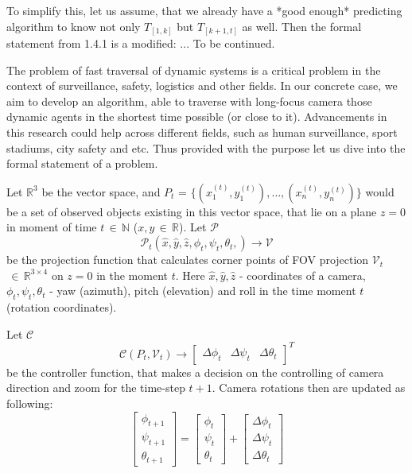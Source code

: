 To simplify this, let us assume, that we already have a *good enough* predicting algorithm to know not only $T_{[1,k]}$ but $T_{[k+1, t]}$ as well. Then the formal statement from 1.4.1 is a modified:
... To be continued.

\fi %

The problem of fast traversal of dynamic systems is a critical problem in the context of surveillance, safety, logistics and other fields. In our concrete case, we aim to develop an algorithm, able to traverse with long-focus camera those dynamic agents in the shortest time possible (or close to it). Advancements in this research could help across different fields, such as human surveillance, sport stadiums, city safety and etc. Thus provided with the purpose let us dive into the formal statement of a problem. 

Let $\mathbb{R}^{3}$ be the vector space, and $P_{t}$ = $\{ (x_{1}^{(t)},y_{1}^{(t)}), \dots, (x_{n}^{(t)},y_{n}^{(t)}) \}$ would be a set of observed objects existing in this vector space, that lie on a plane $z=0$ in moment of time $t \, \in \, \mathbb{N}$ ($x,y \, \in \, \mathbb{R}$). Let $\mathcal{P}$
$$\mathcal{P}_{t}(\hat{x}, \hat{y}, \hat{z}, \phi_{t}, \psi_{t}, \theta_{t},) \to \mathcal{V}$$
be the projection function that calculates corner points of FOV projection $\mathcal{V}_{t}$ $\, \in \, \mathbb{R}^{{3\times4}}$ on $z=0$ in the moment $t$. Here $\hat{x}, \hat{y}, \hat{z}$ - coordinates of a camera, $\phi_{t}, \psi_{t}, \theta_{t}$ - yaw (azimuth), pitch (elevation)  and roll in the time moment $t$ (rotation coordinates).

Let $\mathcal{C}$
$$
\mathcal{C}(P_{t}, \mathcal{V}_{t}) \to \begin{bmatrix}
\Delta\phi_{t}  &  \Delta\psi_{t}  &  \Delta\theta_{t} 
\end{bmatrix}^{T}
$$
be the controller function, that makes a decision on the controlling of camera direction and zoom for the time-step $t+1$.  Camera rotations then are updated as following:
$$
\begin{bmatrix}
\phi_{t+1}   \\
 \psi_{t+1} \\
  \theta_{t+1} 
\end{bmatrix} = 
\begin{bmatrix}
\phi_{t}   \\
 \psi_{t} \\
  \theta_{t}
\end{bmatrix} + 
\begin{bmatrix}
\Delta\phi_{t}  \\
 \Delta\psi_{t}  \\
 \Delta\theta _{t}
\end{bmatrix}
$$

